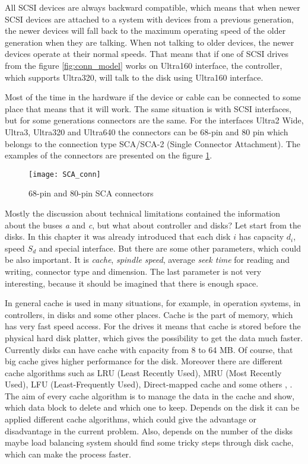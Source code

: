 All SCSI devices are always backward compatible, which means that when newer SCSI devices are attached to a system with devices from a previous generation, the newer devices will fall back to the maximum operating speed of the older generation when they are talking. When not talking to older devices, the newer devices operate at their normal speeds. That means that if one of SCSI drives from the figure \ref{fig:conn_model} works on Ultra160 interface, the controller, which supports Ultra320, will talk to the disk using Ultra160 interface.

Most of the time in the hardware if the device or cable can be connected to some place that means that it will work. The same situation is with SCSI interfaces, but for some generations connectors are the same. For the interfaces Ultra2 Wide, Ultra3, Ultra320 and Ultra640 the connectors can be 68-pin and 80 pin which belongs to the connection type SCA/SCA-2 (Single Connector Attachment). The examples of the connectors are presented on the figure \ref{fig:SCA_conn}.
\begin{figure}[h]
\begin{center}
	\label{fig:SCA_conn}
  \texttt{[image: SCA\_conn]}
\end{center}
  \caption{68-pin and 80-pin SCA connectors}
  \label{fig:SCA_conn}
\end{figure}


Mostly the discussion about technical limitations contained the information about the buses \emph{a} and \emph{c}, but what about controller and disks? Let start from the disks. In this chapter it was already introduced that each disk $i$ has capacity $d_i$, speed $S_d$ and special interface. But there are some other parameters, which could be also important. It is \emph{cache}, \emph{spindle speed}, average \emph{seek time} for reading and writing, connector type and dimension. The last parameter is not very interesting, because it should be imagined that there is enough space.

In general cache is used in many situations, for example, in operation systems, in controllers, in disks and some other places. Cache is the part of memory, which has very fast speed access. For the drives it means that cache is stored before the physical hard disk platter, which gives the possibility to get the data much faster. Currently disks can have cache with capacity from 8 to 64 MB. Of course, that big cache gives higher performance for the disk. Moreover there are different cache algorithms such as LRU (Least Recently Used), MRU (Most Recently Used), LFU (Least-Frequently Used), Direct-mapped cache and some others \cite{cache_alg}, \cite{cache_strategies}. The aim of every cache algorithm is to manage the data in the cache and show, which data block to delete and which one to keep. Depends on the disk it can be applied different cache algorithms, which could give the advantage or disadvantage in the current problem. Also, depends on the number of the disks maybe load balancing system should find some tricky steps through disk cache, which can make the process faster.

